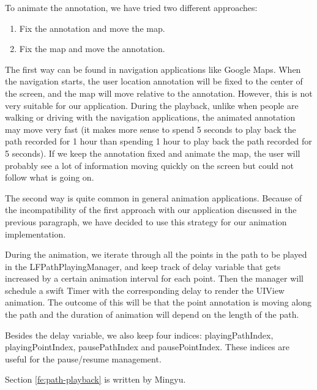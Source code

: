\documentclass[12pt,a4paper]{article}
\renewcommand\texttt[1]{{\ttfamily\color{textttColor}#1}}
\begin{document}
                To animate the annotation, we have tried two different approaches:
                \begin{enumerate}
                    \item Fix the annotation and move the map.
                    \item Fix the map and move the annotation.
                \end{enumerate}
                
                The first way can be found in navigation applications like Google Maps. When the navigation starts, the user location annotation will be fixed to the center of the screen, and the map will move relative to the annotation. However, this is not very suitable for our application. During the playback, unlike when people are walking or driving with the navigation applications, the animated annotation may move very fast (it makes more sense to spend 5 seconds to play back the path recorded for 1 hour than spending 1 hour to play back the path recorded for 5 seconds). If we keep the annotation fixed and animate the map, the user will probably see a lot of information moving quickly on the screen but could not follow what is going on.
                
                The second way is quite common in general animation applications. Because of the incompatibility of the first approach with our application discussed in the previous paragraph, we have decided to use this strategy for our animation implementation.
                
                During the animation, we iterate through all the points in the path to be played in the \texttt{LFPathPlayingManager}, and keep track of \texttt{delay} variable that gets increased by a certain animation interval for each point. Then the manager will schedule a swift \texttt{Timer} with the corresponding delay to render the \texttt{UIView} animation. The outcome of this will be that the point annotation is moving along the path and the duration of animation will depend on the length of the path.
                
                Besides the \texttt{delay} variable, we also keep four indices: \texttt{playingPathIndex}, \texttt{playingPointIndex}, \texttt{pausePathIndex} and \texttt{pausePointIndex}. These indices are useful for the pause/resume management.
                
                \footnotesize
                Section \ref{fe:path-playback} is written by Mingyu.
                \normalsize
            
\end{document}
